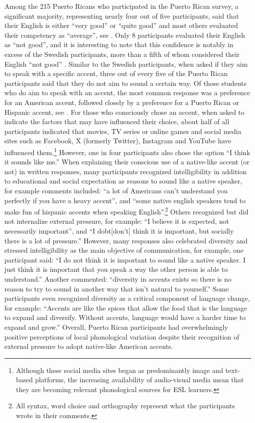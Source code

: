 \documentclass[output=paper,colorlinks,citecolor=brown]{langscibook}
\begin{document}
Among the 215 Puerto Ricans who participated in the Puerto Rican survey, a significant majority, representing nearly four out of five participants, said that their English is either “very good” or “quite good” and most others evaluated their competency as “average”, see . Only 8 participants evaluated their English as “not good”, and it is interesting to note that this confidence is notably in excess of the Swedish participants, more than a fifth of whom considered their English “not good” \citep[13]{Norman_2017}. Similar to the Swedish participants, when asked if they aim to speak with a specific accent, three out of every five of the Puerto Rican participants said that they do not aim to sound a certain way. Of those students who do aim to speak with an accent, the most common response was a preference for an American accent, followed closely by a preference for a Puerto Rican or Hispanic accent, see . For those who consciously chose an accent, when asked to indicate the factors that may have influenced their choice, about half of all participants indicated that movies, TV series or online games and social media sites such as Facebook, X (formerly Twitter), Instagram and YouTube have influenced them.\footnote{Although these social media sites began as predominantly image and text-based platforms, the increasing availability of audio-visual media mean that they are becoming relevant phonological sources for ESL learners.} However, one in four participants also chose the option “I think it sounds like me.” When explaining their conscious use of a native-like accent (or not) in written responses, many participants recognized intelligibility in addition to educational and social expectation as reasons to sound like a native speaker, for example comments included: “a lot of Americans can’t understand you perfectly if you have a heavy accent”, and “some native english speakers tend to make fun of hispanic accents when speaking English”.\footnote{All syntax, word choice and orthography represent what the participants wrote in their comments.} Others recognized but did not internalize external pressure, for example: “I believe it is expected, not necessarily important”, and “I dobt[don’t] think it is important, but socially there is a lot of pressure.” However, many responses also celebrated diversity and stressed intelligibility as the main objective of communication, for example, one participant said: “I do not think it is important to sound like a native speaker. I just think it is important that you speak a way the other person is able to understand.” Another commented: “diversity in accents exists so there is no reason to try to sound in another way that isn't natural to yourself.” Some participants even recognized diversity as a critical component of language change, for example: “Accents are like the spices that allow the food that is the language to expand and diversify. Without accents, language would have a harder time to expand and grow.” Overall, Puerto Rican participants had overwhelmingly positive perceptions of local phonological variation despite their recognition of external pressure to adopt native-like American accents.
\end{document}
